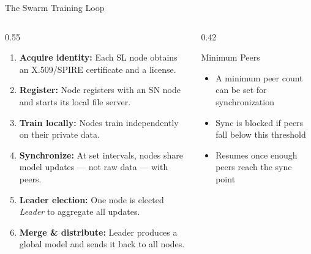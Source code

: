 \documentclass[aspectratio=169]{beamer}
\begin{document}
\begin{frame}{The Swarm Training Loop}
    \begin{columns}[T]
        \begin{column}{0.55\textwidth}
            \begin{enumerate}
                \item \textbf{Acquire identity:} Each SL node obtains an X.509/SPIRE certificate and a license.
                \item \textbf{Register:} Node registers with an SN node and starts its local file server.
                \item \textbf{Train locally:} Nodes train independently on their private data.
                \item \textbf{Synchronize:} At set intervals, nodes share model updates — not raw data — with peers.
                \item \textbf{Leader election:} One node is elected \textit{Leader} to aggregate all updates.
                \item \textbf{Merge \& distribute:} Leader produces a global model and sends it back to all nodes.
            \end{enumerate}
        \end{column}
        \begin{column}{0.42\textwidth}
            \begin{block}{Minimum Peers}
                \begin{itemize}
                    \item A minimum peer count can be set for synchronization
                    \item Sync is blocked if peers fall below this threshold
                    \item Resumes once enough peers reach the sync point
                \end{itemize}
            \end{block}
        \end{column}
    \end{columns}
\end{frame}
\end{document}
